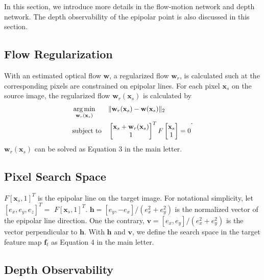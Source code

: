 \documentclass[letterpaper, 10 pt, conference]{ieeeconf}  %
\begin{document}
In this section, we introduce more details in the flow-motion network and depth network. The depth observability of the epipolar point is also discussed in this section.
 
\subsection{Flow Regularization}
 
With an estimated optical flow $\mathbf{w}$, a regularized flow $\mathbf{w}_r$, is calculated such at the corresponding pixels are constrained on epipolar lines. For each pixel $\mathbf{x}_s$ on the source image, the regularized flow $\mathbf{w}_r(\mathbf{x}_s)$ is calculated by
\begin{equation}
    \scalebox{0.95}{$
    \begin{aligned}
    &\mathop{\arg\min}_{\mathbf{w}_r(\mathbf{x}_s)} && \lVert \mathbf{w}_r(\mathbf{x}_s) - 
    \mathbf{w}(\mathbf{x}_s) \rVert_2 \\
    &\text{subject to} && \begin{bmatrix} \mathbf{x}_s + \mathbf{w}_r(\mathbf{x}_s) \\ 1 \end{bmatrix}^T F \begin{bmatrix} \mathbf{x}_s \\ 1 \end{bmatrix} = 0
    \end{aligned}$}.
\end{equation}
$\mathbf{w}_r(\mathbf{x}_s)$ can be solved as Equation 3 in the main letter.
 
\subsection{Pixel Search Space}
 
$F [\mathbf{x}_s, 1]^T$ is the epipolar line on the target image. For notational simplicity, let $[e_x, e_y, e_z]^T = $ $F [\mathbf{x}_s, 1]^T$. $\mathbf{h} = [e_y, -e_x] / (e_x^2+e_y^2)$ is the normalized vector of the epipolar line direction. One the contrary, $\mathbf{v} = [e_x, e_y] / (e_x^2+e_y^2)$ is the vector perpendicular to $\mathbf{h}$. With $\mathbf{h}$ and $\mathbf{v}$, we define the search space in the target feature map $\mathbf{f}_t$ as Equation 4 in the main letter.
 
\subsection{Depth Observability}
 
\end{document}
